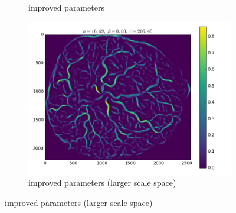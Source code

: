 \documentclass[9pt]{beamer}
\begin{document}
\begin{frame}
\begin{figure}
\begin{subfigure}[t]{0.33\textwidth}
			\caption{improved parameters}
		\end{subfigure}
		\begin{subfigure}[t]{0.33\textwidth}
			\includegraphics[width=\textwidth]{16.png}
			\caption{improved parameters (larger scale space)}
		\end{subfigure}
	\end{figure}

\end{frame}
\end{document}
